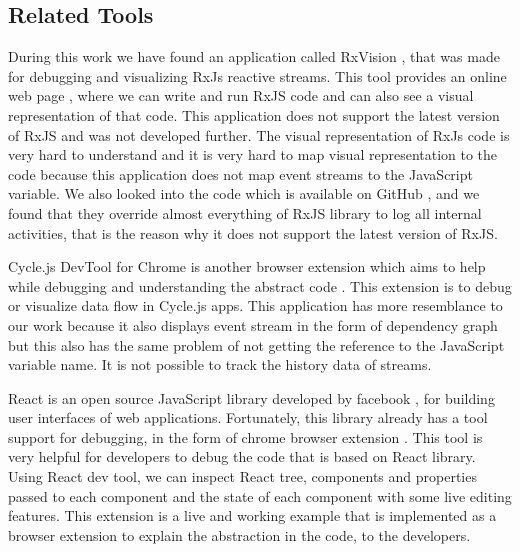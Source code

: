 \subsection{Related Tools}
During this work we have found an application called RxVision \cite{GithubRxvision}, that was made for debugging and visualizing RxJs reactive streams. This tool provides an online web page \cite{PlaygroundRxvision}, where we can write and run RxJS code and can also see a visual representation of that code. This application does not support the latest version of RxJS and was not developed further. The visual representation of RxJs code is very hard to understand and it is very hard to map visual representation to the code because this application does not map event streams to the JavaScript variable. We also looked into the code which is available on GitHub \cite{GithubRxvision}, and we found that they override almost everything of RxJS library to log all internal activities, that is the reason why it does not support the latest version of RxJS.

Cycle.js DevTool for Chrome is another browser extension which aims to help while debugging and understanding the abstract code \cite{GithubCycleJsDevtool}. This extension is to debug or visualize data flow in Cycle.js \cite{CycleJs} apps. This application has more resemblance to our work because it also displays event stream in the form of dependency graph but this also has the same problem of not getting the reference to the JavaScript variable name. It is not possible to track the history data of streams.

React is an open source JavaScript library developed by facebook \cite{ReactFacebook}, for building user interfaces of web applications. Fortunately, this library already has a tool support for debugging, in the form of chrome browser extension \cite{ReactFacebookChrome}. This tool is very helpful for developers to debug the code that is based on React library. Using React dev tool, we can inspect React tree, components and properties passed to each component and the state of each component with some live editing features. This extension is a live and working example that is implemented as a browser extension to explain the abstraction in the code, to the developers.





